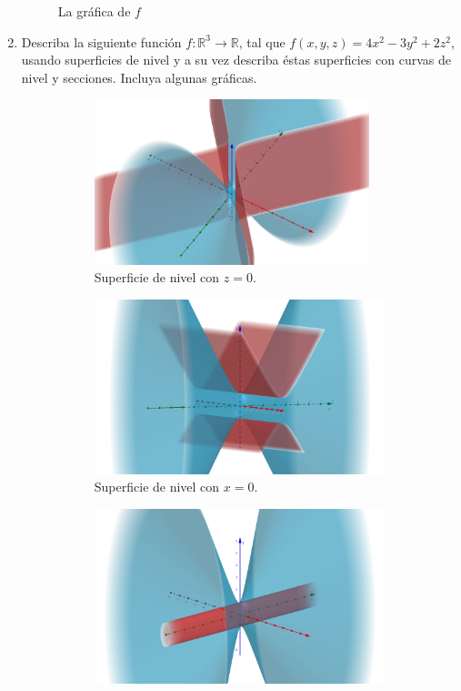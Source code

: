 \documentclass[letterpaper,11pt]{article}
\begin{document}
\begin{enumerate}
\begin{figure}[h!]
	\caption{La gráfica de $ f $}
\end{figure}
\newpage
\item Describa la siguiente función $f:\mathbb{R}^3 \longrightarrow \mathbb{R}$, tal que $f(x,y,z) = 4x^2-3y^2+2z^2$, usando superficies de nivel y a su vez describa éstas superficies con curvas de nivel y secciones. Incluya algunas gráficas.

\begin{figure}[h]
	\centering
	\begin{subfigure}{.7\textwidth}
		\centering
		\includegraphics[width=8cm]{img/2a1}
		\caption{Superficie de nivel con $z = 0$.}
		\label{F1_1}
	\end{subfigure}
	\begin{subfigure}{.4\textwidth}
		\includegraphics[width=\linewidth]{img/2a2}
		\caption{Superficie de nivel con $x = 0$.}
		\label{F1_2}
	\end{subfigure}
	\begin{subfigure}{.4\textwidth}
		\includegraphics[width=\linewidth]{img/2a3}

\end{subfigure}
\end{figure}
\end{enumerate}
\end{document}
